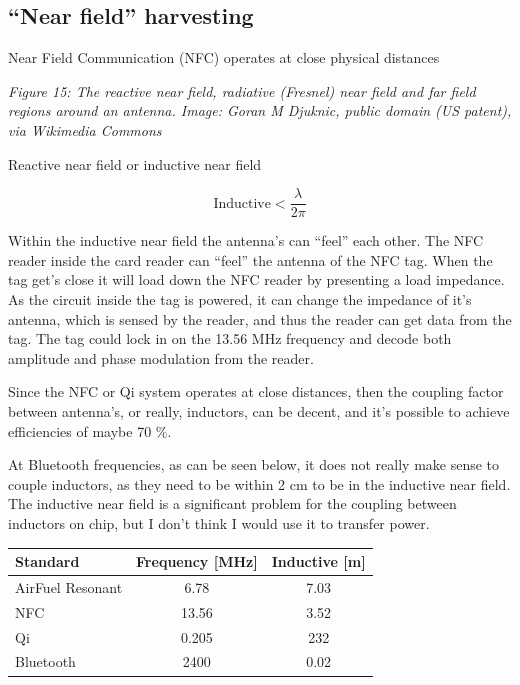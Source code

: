 \subsection{``Near field'' harvesting}\label{near-field-harvesting}

Near Field Communication (NFC) operates at close physical distances


{
\centering
{}
}

\emph{Figure 15: The reactive near field, radiative (Fresnel) near field
and far field regions around an antenna. Image: Goran M Djuknic, public
domain (US patent), via Wikimedia Commons}

Reactive near field or inductive near field

\[ \text{Inductive} < \frac{\lambda}{2 \pi}\]

Within the inductive near field the antenna's can ``feel'' each other.
The NFC reader inside the card reader can ``feel'' the antenna of the
NFC tag. When the tag get's close it will load down the NFC reader by
presenting a load impedance. As the circuit inside the tag is powered,
it can change the impedance of it's antenna, which is sensed by the
reader, and thus the reader can get data from the tag. The tag could
lock in on the 13.56 MHz frequency and decode both amplitude and phase
modulation from the reader.

Since the NFC or Qi system operates at close distances, then the
coupling factor between antenna's, or really, inductors, can be decent,
and it's possible to achieve efficiencies of maybe 70 \%.

At Bluetooth frequencies, as can be seen below, it does not really make
sense to couple inductors, as they need to be within 2 cm to be in the
inductive near field. The inductive near field is a significant problem
for the coupling between inductors on chip, but I don't think I would
use it to transfer power.

\begin{longtable}[]{@{}lcc@{}}
\toprule\noalign{}
Standard & Frequency {[}MHz{]} & Inductive {[}m{]} \\
\midrule\noalign{}
\endhead
\bottomrule\noalign{}
\endlastfoot
AirFuel Resonant & 6.78 & 7.03 \\
NFC & 13.56 & 3.52 \\
Qi & 0.205 & 232 \\
Bluetooth & 2400 & 0.02 \\
\end{longtable}

